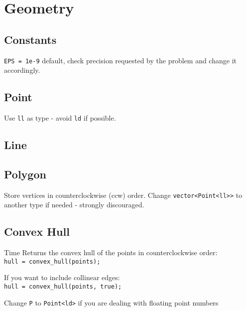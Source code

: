 \section{Geometry}

\subsection{Constants}
\verb|EPS = 1e-9| default, check precision requested by the problem and
change it accordingly.



\subsection{Point}
Use \verb|ll| as type - avoid \verb|ld| if possible.


\subsection{Line}


\subsection{Polygon}
Store vertices in counterclockwise (ccw) order.
Change \verb|vector<Point<ll>>| to another type if needed - strongly discouraged.



\subsection{Convex Hull}
 Time
Returns the convex hull of the points in counterclockwise order: \\
\verb|hull = convex_hull(points);|

If you want to include collinear edges: \\
\verb|hull = convex_hull(points, true);|

Change \verb|P| to \verb|Point<ld>| if you are dealing with floating point numbers

